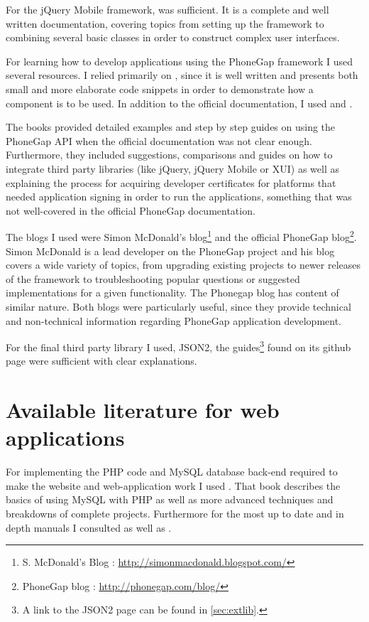 \documentclass[12pt]{ecsproject}     %
\begin{document}
For the jQuery Mobile framework, \cite{jqmdocs} was sufficient. It is a complete and well written documentation, covering topics from setting up the framework to combining several basic classes in order to construct complex user interfaces.

For learning how to develop applications using the PhoneGap framework I used several resources. I relied primarily on \cite{pgdocs}, since it is well written and presents both small and more elaborate code snippets in order to demonstrate how a component is to be used. In addition to the official documentation, I used \citet{pgcook} and \cite{pge}.

The books provided detailed examples and step by step guides on using the PhoneGap API when the official documentation was not clear enough. Furthermore, they included suggestions, comparisons and guides on how to integrate third party libraries (like jQuery, jQuery Mobile or XUI) as well as explaining the process for acquiring developer certificates for platforms that needed application signing in order to run the applications, something that was not well-covered in the official PhoneGap documentation.

The blogs I used were Simon McDonald's blog\footnote{S. McDonald's Blog : \href{http://simonmacdonald.blogspot.com/}{http://simonmacdonald.blogspot.com/}} and the official PhoneGap blog\footnote{PhoneGap blog : \href{http://phonegap.com/blog/}{http://phonegap.com/blog/}}. Simon McDonald is a lead developer on the PhoneGap project and his blog covers a wide variety of topics, from upgrading existing projects to newer releases of the framework to troubleshooting popular questions or suggested implementations for a given functionality. The Phonegap blog has content of similar nature. Both blogs were particularly useful, since they provide technical and non-technical information regarding PhoneGap application development.

For the final third party library I used, JSON2, the guides\footnote{A link to the JSON2 page can be found in \ref{sec:extlib}.} found on its github page were sufficient with clear explanations.

\section{Available literature for web applications}

For implementing the PHP code and MySQL database back-end required to make the website and web-application work I used \cite{pmwd}. That book describes the basics of using MySQL with PHP as well as more advanced techniques and breakdowns of complete projects. Furthermore for the most up to date and in depth manuals I consulted \cite{phpdoc} as well as \cite{mysqldoc}.
\end{document}
